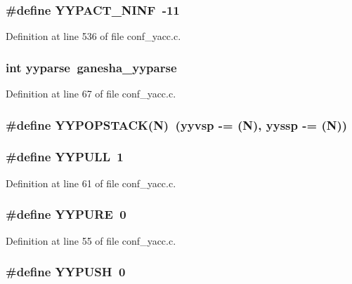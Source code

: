 \subsubsection[{YYPACT\_\-NINF}]{\setlength{\rightskip}{0pt plus 5cm}\#define YYPACT\_\-NINF~-\/11}\label{conf__yacc_8c_a62bf0ed0c4360b077071b5cf3177823b}


Definition at line 536 of file conf\_\-yacc.c.
\subsubsection[{yyparse}]{\setlength{\rightskip}{0pt plus 5cm}int yyparse~ganesha\_\-yyparse}\label{conf__yacc_8c_aa23178cbe072d03b46f5c307f7918e7b}


Definition at line 67 of file conf\_\-yacc.c.
\subsubsection[{YYPOPSTACK}]{\setlength{\rightskip}{0pt plus 5cm}\#define YYPOPSTACK(N)~(yyvsp -\/= (N), yyssp -\/= (N))}\label{conf__yacc_8c_ad2f9773cd9c031026b2ef4c1ee7be1be}
\subsubsection[{YYPULL}]{\setlength{\rightskip}{0pt plus 5cm}\#define YYPULL~1}\label{conf__yacc_8c_a90f059b8a9d6c30a1e44e1b80d3fd6c8}


Definition at line 61 of file conf\_\-yacc.c.
\subsubsection[{YYPURE}]{\setlength{\rightskip}{0pt plus 5cm}\#define YYPURE~0}\label{conf__yacc_8c_a9fa797a1f3c4fc9b12d1e4d569612767}


Definition at line 55 of file conf\_\-yacc.c.
\subsubsection[{YYPUSH}]{\setlength{\rightskip}{0pt plus 5cm}\#define YYPUSH~0}\label{conf__yacc_8c_a3aa6e4af11755f8cf8e5ddb26833e918}



